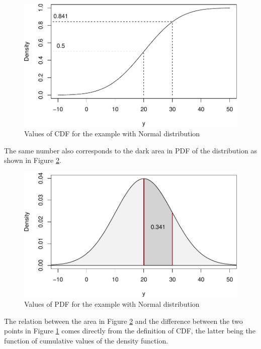 \documentclass[
]{book}
\theoremstyle{definition}
\theoremstyle{definition}
\theoremstyle{definition}
\theoremstyle{definition}
\theoremstyle{remark}
\begin{document}
\begin{figure}
\centering
\includegraphics{Svetunkov---Statistics-for-Business-Analytics_files/figure-latex/pnormExample-1.pdf}
\caption{\label{fig:pnormExample}Values of CDF for the example with Normal distribution}
\end{figure}

The same number also corresponds to the dark area in PDF of the distribution as shown in Figure \ref{fig:dnormExample}.

\begin{figure}
\centering
\includegraphics{Svetunkov---Statistics-for-Business-Analytics_files/figure-latex/dnormExample-1.pdf}
\caption{\label{fig:dnormExample}Values of PDF for the example with Normal distribution}
\end{figure}

The relation between the area in Figure \ref{fig:dnormExample} and the difference between the two points in Figure \ref{fig:pnormExample} comes directly from the definition of CDF, the latter being the function of cumulative values of the density function.
\end{document}
